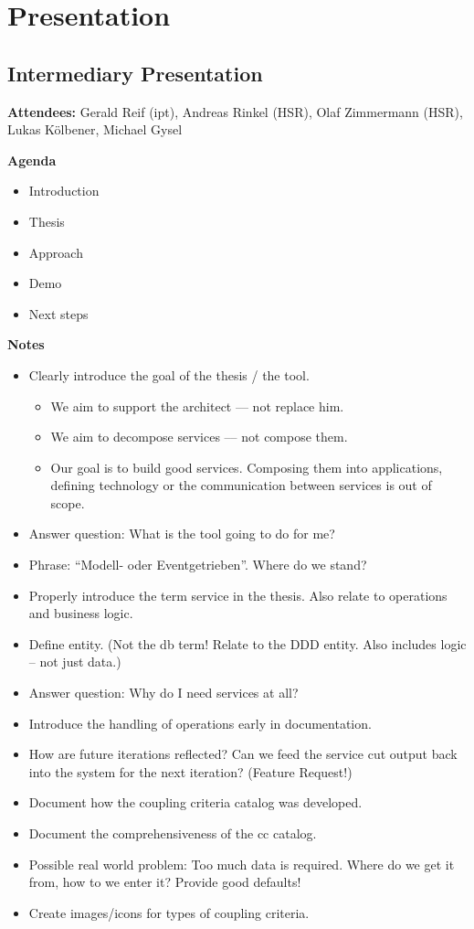 \section{Presentation}

\subsection{Intermediary Presentation }

\textbf{Attendees:} Gerald Reif (ipt), Andreas Rinkel (HSR), Olaf Zimmermann (HSR), Lukas Kölbener, Michael Gysel

\textbf{Agenda}

\begin{itemize}
\item Introduction
\item Thesis
\item Approach
\item Demo
\item Next steps
\end{itemize}


\textbf{Notes}

\begin{itemize}
\item Clearly introduce the goal of the thesis / the tool.
	\begin{itemize}
	\item We aim to support the architect --– not replace him.
	\item We aim to decompose services --– not compose them.
	\item Our goal is to build good services. Composing them into applications, defining technology or the communication between services is out of scope.
	\end{itemize}
\item Answer question: What is the tool going to do for me?
\item Phrase: \enquote{Modell- oder Eventgetrieben}. Where do we stand?
\item Properly introduce the term service in the thesis. Also relate to operations and business logic.
\item Define entity. (Not the db term! Relate to the DDD entity. Also includes logic – not just data.)
\item Answer question: Why do I need services at all?
\item Introduce the handling of operations early in documentation.
\item How are future iterations reflected? Can we feed the service cut output back into the system for the next iteration? (Feature Request!)
\item Document how the coupling criteria catalog was developed.
\item Document the comprehensiveness of the cc catalog.
\item Possible real world problem: Too much data is required. Where do we get it from, how to we enter it? Provide good defaults!
\item Create images/icons for types of coupling criteria.
\end{itemize}


